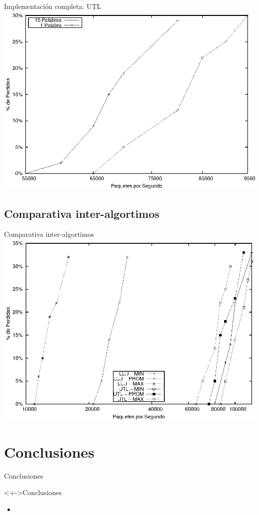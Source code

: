 \documentclass[xcolor=dvipsnames]{beamer}
\begin{document}
\begin{frame}{Implementación completa: UTL} 
\center	
\includegraphics[scale=0.70]{figures/utlmax.eps} 
\end{frame}

\subsection{Comparativa inter-algortimos}
\begin{frame}{Comparativa inter-algortimos} 
\center	
\includegraphics[scale=0.70]{figures/lluvsutl.eps} 
\end{frame}

\section{Conclusiones}
\begin{frame}{Conclusiones} 
\begin{block}<+->{Conclusiones}   
    \begin{itemize}
      \scriptsize
     	\item     	
    \end{itemize}
  \end{block}
\end{frame}
\end{document}
